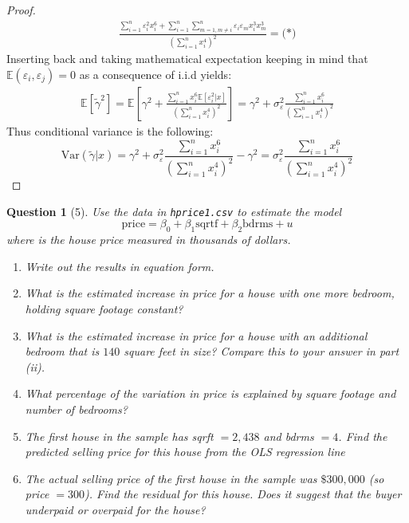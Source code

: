 \documentclass[12pt,reqno]{amsart}
\theoremstyle{plain}
\newcommand{\E}{\mathbb{E}}
\newtheorem*{theorem*}{Question}
\begin{document}
\begin{proof}
\begin{gather*}
        \frac{\sum_{i=1}^{n} \varepsilon_i^{2} x_i^{6} + \sum_{i=1}^{n} \sum_{m=1, m\ne i}^{n} \varepsilon_i \varepsilon_m x_i^{3}x_m^{3}}{\left(\sum_{i=1}^{n} x_{i}^{4}\right)^{2}} = \textbf{(*)}
    \end{gather*}
    Inserting back and taking mathematical expectation keeping in mind that $ \E (\varepsilon_{i}, \varepsilon_{j}) = 0 $
    as a consequence of i.i.d yields:
    \begin{gather*}
        \E \left[ \tilde{\gamma}^{2} \right] = \E \left[ \gamma^{2} + \frac{\sum_{i=1}^{n} x_i^{6} \E \left[ \varepsilon_{i}^{2} | x \right]}{\left( \sum_{i=1}^{n} x_{i}^{4} \right)^{2} } \right] =
        \gamma^{2} + \sigma^{2}_{\varepsilon} \frac{\sum_{i=1}^{n} x_i^{6} }{\left( \sum_{i=1}^{n} x_{i}^{4} \right)^{2} }
    \end{gather*}
    Thus conditional variance is the following:
    \[
        \text{Var}(\tilde\gamma | x) = \gamma^{2} + \sigma^{2}_{\varepsilon} \frac{\sum_{i=1}^{n} x_i^{6} }{\left( \sum_{i=1}^{n} x_{i}^{4} \right)^{2} } - \gamma^{2}  = \sigma^{2}_{\varepsilon} \frac{\sum_{i=1}^{n} x_i^{6} }{\left( \sum_{i=1}^{n} x_{i}^{4} \right)^{2} }
    \]
\end{proof}
\begin{theorem*}[5]
    \normalfont
    Use the data in \texttt{hprice1.csv} to estimate the model
    \[
        \text{price} = \beta_{0} + \beta_{1}\text{sqrtf} + \beta_{2}\text{bdrms} + u
    \]
    where  is the house price measured in thousands of dollars.
    \begin{enumerate}
        \item Write out the results in equation form.
        \item What is the estimated increase in price for a house with one more bedroom, holding square footage constant?
        \item What is the estimated increase in price for a house with an additional bedroom that is $ 140$ square feet in size? Compare this to your answer in part (ii).
        \item What percentage of the variation in price is explained by square footage and number of bedrooms?
        \item The first house in the sample has sqrft $ =2,438 $ and bdrms $ = 4 $. Find the predicted selling price for this house from the OLS regression line
        \item The actual selling price of the first house in the sample was $ \$300,000 $ (so price $ =300 $). Find the residual for this house. Does it suggest that the buyer underpaid or overpaid for the house?
    \end{enumerate}

\end{theorem*}
\end{document}
